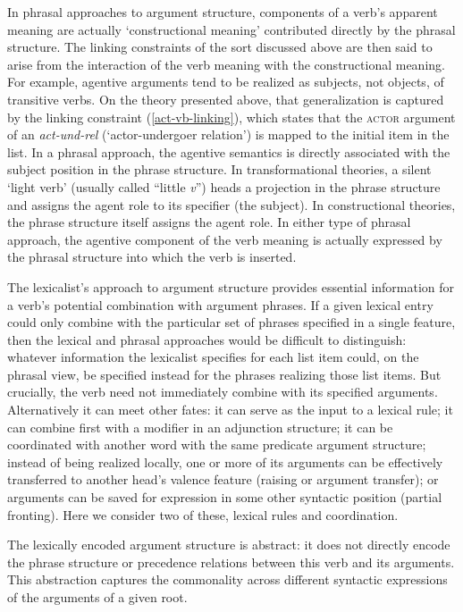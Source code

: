 \documentclass[output=paper
                ,modfonts
                ,nonflat
	        ,collection
	        ,collectionchapter
	        ,collectiontoclongg
 	        ,biblatex
                ,babelshorthands
                ,newtxmath
                ,draftmode
                ,colorlinks, citecolor=brown
]{./langsci/langscibook}
\begin{document}
In phrasal approaches  to argument structure, components of a verb's apparent meaning are actually `constructional meaning' contributed directly by the phrasal structure.  The linking constraints of the sort discussed above are then said to arise from the interaction of the verb meaning with the constructional meaning.  For example, agentive arguments tend to be realized as subjects, not objects, of transitive verbs.  On the theory presented above, that generalization is captured by the linking constraint (\ref{act-vb-linking}), which states that the \textsc{actor} argument of an \textit{act-und-rel} (`actor-undergoer relation') is mapped to the initial item in the \argst list.  In a phrasal approach, the agentive semantics is directly associated with the subject position in the phrase structure.  In transformational theories, a silent `light verb' (usually called ``little \textit{v}'') heads a projection in the phrase structure and assigns the agent role to its specifier (the subject).  In constructional theories, the phrase structure itself assigns the agent role.  In either type of phrasal approach, the agentive component of the verb meaning is actually expressed by the phrasal structure into which the verb is inserted.  


The lexicalist’s approach to argument structure provides essential information for a verb's potential
combination with argument phrases.   If a given lexical entry could only  combine with the particular set of phrases specified in a single \val feature, then the lexical and phrasal approaches would be difficult to distinguish: whatever information the lexicalist specifies for each \val list item could, on the phrasal view, be specified instead for the phrases realizing those list items.  
But crucially, the verb need not immediately combine with its specified
arguments.  Alternatively it can meet other fates: it can serve as the input to a lexical rule; it
can combine first with a modifier in an adjunction structure; it can be coordinated with another
word with the same predicate argument structure; instead of being realized locally, one or more of
its arguments can be effectively transferred to another head’s valence feature (raising or argument
transfer); or arguments can be saved for expression in some other syntactic position (partial
fronting).   Here we consider two of these, lexical rules and coordination.  
 
The lexically encoded argument structure is abstract: it does not directly encode the phrase structure or
precedence relations between this verb and its arguments. This abstraction captures the commonality
across different syntactic expressions of the arguments of a given root.
\end{document}
